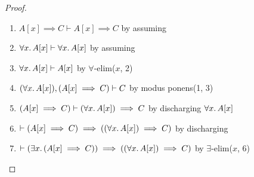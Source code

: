 \begin{proof}
\begin{enumerate}
\item $A[x]\implies C\vdash A[x]\implies C$
  by assuming%
\item $\forall x\ldotp A[x]\vdash\forall x\ldotp A[x]$ by assuming%
\item $\forall x\ldotp A[x]\vdash A[x]$ by $\forall$-elim($x$, 2)%
\item $(\forall x\ldotp A[x]),(A[x]\implies C)\vdash C$
  by modus ponens(1, 3)%
\item $(A[x]\implies C)\vdash(\forall x\ldotp A[x])\implies C$
  by discharging $\forall x\ldotp A[x]$%
\item $\vdash(A[x]\implies C)\implies((\forall x\ldotp A[x])\implies C)$
  by discharging%
\item $\vdash(\exists x\ldotp(A[x]\implies C))\implies((\forall x\ldotp A[x])\implies C)$
  by $\exists$-elim($x$, 6)\qedhere
\end{enumerate}
\end{proof}

